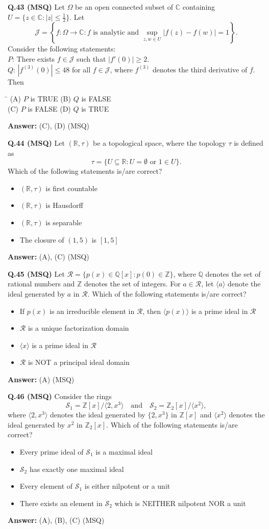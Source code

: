 \documentclass[11pt,a4paper]{article}
\newcommand{\optsfourA}[4]{%
  \begin{tabbing}
    \hspace{0.48\linewidth}\=\kill
    (A) #1 \> (B) #2 \\[2pt]
    (C) #3 \> (D) #4
  \end{tabbing}%
}
\newcommand{\optslistA}[4]{%
  \begin{itemize}
    \setlength{\itemsep}{2pt}\setlength{\parskip}{0pt}
    \item[(A)] #1
    \item[(B)] #2
    \item[(C)] #3
    \item[(D)] #4
  \end{itemize}%
}
\newcommand{\ans}[1]{\textbf{Answer:} #1\par\medskip}
\begin{document}
\textbf{Q.43 (MSQ)} Let $\Omega$ be an open connected subset of $\mathbb{C}$ containing $U = \{z \in \mathbb{C} : |z| \le \frac{1}{2}\}$. Let
\[
  \mathcal{J} = \left\{f : \Omega \to \mathbb{C} : f \text{ is analytic and } \sup_{z, w \in U} |f(z) - f(w)| = 1\right\}.
\]
Consider the following statements:\\
$P$: There exists $f \in \mathcal{J}$ such that $|f'(0)| \ge 2$.\\
$Q$: $|f^{(3)}(0)| \le 48$ for all $f \in \mathcal{J}$, where $f^{(3)}$ denotes the third derivative of $f$.\\
Then
\optsfourA{$P$ is TRUE}{$Q$ is FALSE}{$P$ is FALSE}{$Q$ is TRUE}
\ans{(C), (D) (MSQ)}

\textbf{Q.44 (MSQ)} Let $(\mathbb{R}, \tau)$ be a topological space, where the topology $\tau$ is defined as
\[
  \tau = \{U \subseteq \mathbb{R} : U = \emptyset \text{ or } 1 \in U\}.
\]
Which of the following statements is/are correct?
\optslistA{$(\mathbb{R}, \tau)$ is first countable}{$(\mathbb{R}, \tau)$ is Hausdorff}{$(\mathbb{R}, \tau)$ is separable}{The closure of $(1, 5)$ is $[1, 5]$}
\ans{(A), (C) (MSQ)}

\textbf{Q.45 (MSQ)} Let $\mathcal{R} = \{p(x) \in \mathbb{Q}[x] : p(0) \in \mathbb{Z}\}$, where $\mathbb{Q}$ denotes the set of rational numbers and $\mathbb{Z}$ denotes the set of integers. For $a \in \mathcal{R}$, let $\langle a \rangle$ denote the ideal generated by $a$ in $\mathcal{R}$. Which of the following statements is/are correct?
\optslistA{If $p(x)$ is an irreducible element in $\mathcal{R}$, then $\langle p(x) \rangle$ is a prime ideal in $\mathcal{R}$}{$\mathcal{R}$ is a unique factorization domain}{$\langle x \rangle$ is a prime ideal in $\mathcal{R}$}{$\mathcal{R}$ is NOT a principal ideal domain}
\ans{(A) (MSQ)}

\textbf{Q.46 (MSQ)} Consider the rings
\[
  \mathcal{S}_1 = \mathbb{Z}[x]/\langle 2, x^3 \rangle \quad \text{and} \quad \mathcal{S}_2 = \mathbb{Z}_2[x]/\langle x^2 \rangle,
\]
where $\langle 2, x^3 \rangle$ denotes the ideal generated by $\{2, x^3\}$ in $\mathbb{Z}[x]$ and $\langle x^2 \rangle$ denotes the ideal generated by $x^2$ in $\mathbb{Z}_2[x]$. Which of the following statements is/are correct?
\optslistA{Every prime ideal of $\mathcal{S}_1$ is a maximal ideal}{$\mathcal{S}_2$ has exactly one maximal ideal}{Every element of $\mathcal{S}_1$ is either nilpotent or a unit}{There exists an element in $\mathcal{S}_2$ which is NEITHER nilpotent NOR a unit}
\ans{(A), (B), (C) (MSQ)}
\end{document}
